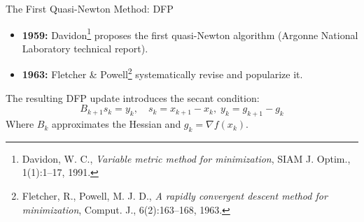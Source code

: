 \documentclass[aspectratio=169]{beamer}
\begin{document}
	\begin{frame}{The First Quasi-Newton Method: DFP}
		\begin{itemize}
			\item \textbf{1959:} Davidon\footnote{Davidon, W. C., \emph{Variable metric method for minimization}, SIAM J. Optim., 1(1):1–17, 1991.} proposes the first quasi-Newton algorithm (Argonne National Laboratory technical report).
			\item \textbf{1963:} Fletcher \& Powell\footnote{Fletcher, R., Powell, M. J. D., \emph{A rapidly convergent descent method for minimization}, Comput. J., 6(2):163–168, 1963.} systematically revise and popularize it.
		\end{itemize}
		
		The resulting DFP update introduces the secant condition:
		\[
		B_{k+1}s_k = y_k,\quad s_k=x_{k+1}-x_k,\; y_k=g_{k+1}-g_k
		\]
		Where $B_k$ approximates the Hessian and $g_k=\nabla f(x_k)$.
		
	\end{frame}
\end{document}
